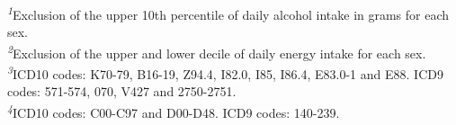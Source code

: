 \documentclass[sn-basic,Numbered,pdflatex]{sn-jnl}
\begin{document}
\begin{landscape}
\begin{longtable}
\bottomrule
\end{longtable}
\begin{minipage}{\linewidth}
\textsuperscript{\textit{1}}Exclusion of the upper 10th percentile of daily alcohol intake in grams for each sex.\\
\textsuperscript{\textit{2}}Exclusion of the upper and lower decile of daily energy intake for each sex.\\
\textsuperscript{\textit{3}}ICD10 codes: K70-79, B16-19, Z94.4, I82.0, I85, I86.4, E83.0-1 and E88. ICD9 codes: 571-574, 070, V427 and 2750-2751.\\
\textsuperscript{\textit{4}}ICD10 codes: C00-C97 and D00-D48. ICD9 codes: 140-239.\\
\end{minipage}
\endgroup

\end{landscape}

\newpage


\end{document}
